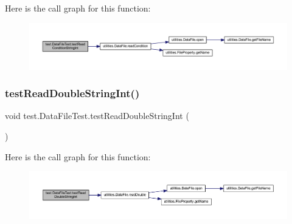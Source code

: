 Here is the call graph for this function\+:\nopagebreak
\begin{figure}[H]
\begin{center}
\leavevmode
\includegraphics[width=350pt]{classtest_1_1_data_file_test_afceb03fbe887feb7c9c51074ea1c41d8_cgraph}
\end{center}
\end{figure}
\mbox{\label{classtest_1_1_data_file_test_a839677c199693ab93375ec09dfbb3407}} 
\subsubsection{\texorpdfstring{test\+Read\+Double\+String\+Int()}{testReadDoubleStringInt()}}
{\footnotesize\ttfamily void test.\+Data\+File\+Test.\+test\+Read\+Double\+String\+Int (\begin{DoxyParamCaption}{ }\end{DoxyParamCaption})}

Here is the call graph for this function\+:\nopagebreak
\begin{figure}[H]
\begin{center}
\leavevmode
\includegraphics[width=350pt]{classtest_1_1_data_file_test_a839677c199693ab93375ec09dfbb3407_cgraph}
\end{center}
\end{figure}
\mbox{\label{classtest_1_1_data_file_test_aa614885277711640980410c5faa5b609}} 
